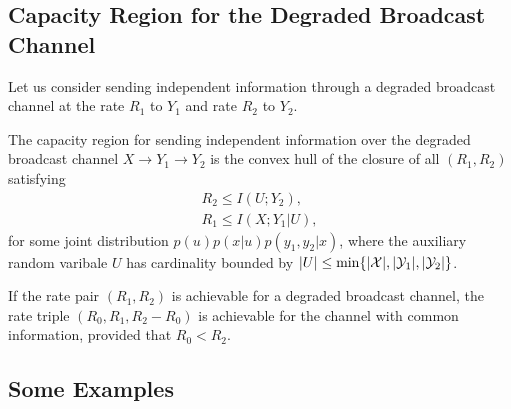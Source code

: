 \subsection{Capacity Region for the Degraded Broadcast Channel}
Let us consider sending independent information through a degraded broadcast channel at the rate $R_1$ to $Y_1$ and rate $R_2$ to $Y_2$.
%
\begin{tcolorbox}[boxrule=0pt,frame hidden,sharp corners,enhanced, opacityback=0, borderline west={2pt}{0pt}{blue}]
\begin{thm} 
The capacity region for sending independent information over the degraded broadcast channel $X \rightarrow Y_1 \rightarrow Y_2$ is the convex hull of the closure of all $(R_1, R_2)$ satisfying
%
\begin{eqnarray}
    R_2 \leq I(U;Y_2), \\
    R_1 \leq I(X; Y_1|U),
\end{eqnarray}
%
for some joint distribution $p(u)p(x|u)p(y_1,y_2|x)$, where the auxiliary random varibale $U$ has cardinality bounded by $\abs{U} \leq \min\{\abs{\mathcal{X}}, \abs{\mathcal{Y}_1}, \abs{\mathcal{Y}_2} \}$.
\end{thm}
\end{tcolorbox}
%
%
\begin{tcolorbox}[boxrule=0pt,frame hidden,sharp corners,enhanced, opacityback=0, borderline west={2pt}{0pt}{blue}]
\begin{thm} 
If the rate pair $(R_1, R_2)$ is achievable for a degraded broadcast channel, the rate triple $(R_0, R_1, R_2-R_0)$ is achievable for the channel with common information, provided that $R_0 < R_2$.
\end{thm}
\end{tcolorbox}
%

\subsection{Some Examples}
%
